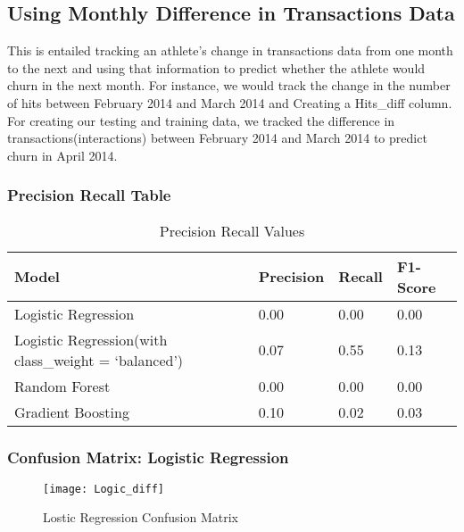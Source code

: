\documentclass[
10pt, %
a4paper, %
oneside, %
headinclude,footinclude, %
BCOR5mm, %
]{scrartcl}
\begin{document}
\subsection{Using Monthly Difference in Transactions Data}

This is entailed tracking an athlete's change in transactions data from one month to the next and using that information to predict whether the athlete would churn in the next month. For instance, we would track the change in the number of hits between February 2014 and March 2014 and Creating a Hits\_diff column. For creating our testing and training data, we tracked the difference in transactions(interactions) between February 2014 and March 2014 to predict churn in April 2014.

\subsubsection{Precision Recall Table} 

\begin{table}[H]
\centering
\caption{Precision Recall Values}
\label{my-label}
\begin{tabular}{@{}llll@{}}
\toprule
Model               & Precision & Recall & F1-Score \\ \midrule
Logistic Regression & 0.00      & 0.00   & 0.00     \\
Logistic Regression(with class\_weight = `balanced') & 0.07      & 0.55   & 0.13     \\
Random Forest       & 0.00      & 0.00   & 0.00     \\
Gradient Boosting   & 0.10      & 0.02   & 0.03     \\ \bottomrule
\end{tabular}
\end{table}

\subsubsection{\textbf{Confusion Matrix}: Logistic Regression}

\begin{figure}[H]
\centering 
\texttt{[image: Logic\_diff]} 
\caption[Lostic Regression Confusion Matrix]{Lostic Regression Confusion Matrix} %
\label{fig:gallery} 
\end{figure}
\end{document}
